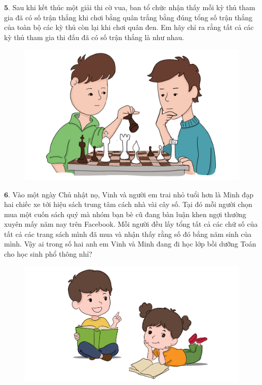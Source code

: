 \begin{multicols}{2}
\begin{figure}[H]
		\vspace*{-20pt}
	\end{figure}
	$\pmb{5.}$ 	Sau khi kết thúc một giải thi cờ vua, ban tổ chức nhận thấy mỗi kỳ thủ tham gia đã có số trận thắng khi chơi bằng quân trắng bằng đúng tổng số trận thắng của toàn bộ các kỳ thủ còn lại khi chơi quân đen. Em hãy chỉ ra rằng tất cả các kỳ thủ tham gia thi đấu đã có số trận thắng là như nhau.
	\begin{figure}[H]
		\centering
		\vspace*{-5pt}
		\captionsetup{labelformat= empty, justification=centering}
		\includegraphics[width=0.75\linewidth]{Pi1_2_Bai5}
		\vspace*{-10pt}
	\end{figure}
	$\pmb{6.}$ Vào một ngày Chủ nhật nọ, Vinh và người em trai nhỏ tuổi hơn là Minh  đạp hai chiếc xe tới hiệu sách trung tâm cách nhà vài cây số. Tại đó mỗi người chọn mua một cuốn sách quý mà nhóm bạn bè cũ đang bàn luận khen ngợi thường xuyên mấy năm nay trên Facebook. Mỗi người đều lấy tổng tất cả các chữ số của tất cả các trang sách mình đã mua và nhận thấy rằng số đó bẳng năm sinh của mình. Vậy ai  trong số hai anh em Vinh và Minh  đang đi học lớp  bồi dưỡng Toán cho học sinh phổ thông nhỉ?
	\begin{figure}[H]
		\centering
		\vspace*{-5pt}
		\captionsetup{labelformat= empty, justification=centering}
		\includegraphics[width=1\linewidth]{Pi1_2_Bai6}
		\vspace*{-10pt}
	\end{figure}
\end{multicols}
